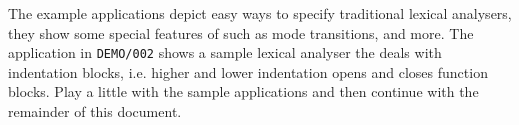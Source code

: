 The example applications depict easy ways to specify
traditional lexical analysers, they show some special features of {\quex} such
as mode transitions, and more. The application in {\tt DEMO/002} shows a
sample lexical analyser the deals with indentation blocks, i.e. higher and
lower indentation opens and closes function blocks. Play a little with the
sample applications and then continue with the remainder of this document.

